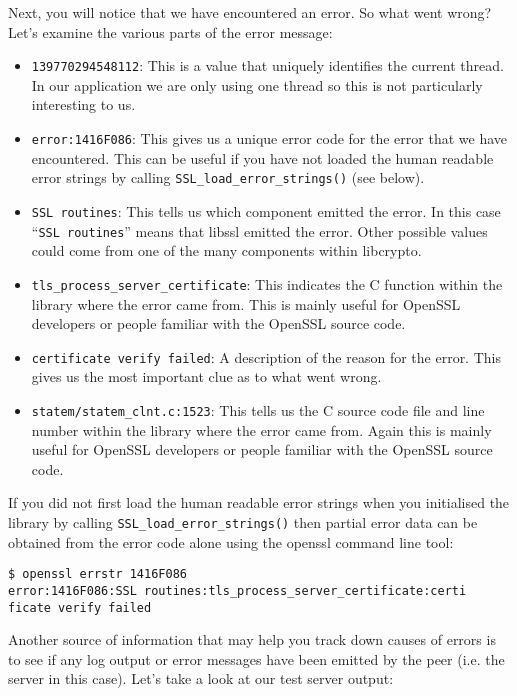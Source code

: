Next, you will notice that we have encountered an error. So what went wrong? 
Let's examine the various parts of the error message:
\begin{itemize}
\item \texttt{139770294548112}: This is a value that uniquely identifies the
current thread. In our application we are only using one thread so this is not 
particularly interesting to us.
\item \texttt{error:1416F086}: This gives us a unique error code for the error
that we have encountered. This can be useful if you have not loaded the human
readable error strings by calling \texttt{SSL\_load\_error\_strings()} (see
below).
\item \texttt{SSL routines}: This tells us which component emitted the error. In
this case ``\texttt{SSL routines}'' means that libssl emitted the error. Other
possible values could come from one of the many components within libcrypto.
\item \texttt{tls\_process\_server\_certificate}: This indicates the C function
within the library where the error came from. This is mainly useful for OpenSSL
developers or people familiar with the OpenSSL source code.
\item \texttt{certificate verify failed}: A description of the reason for the
error. This gives us the most important clue as to what went wrong.
\item \texttt{statem/statem\_clnt.c:1523}: This tells us the C source code file 
and line number within the library where the error came from. Again this is
mainly  useful for OpenSSL developers or people familiar with the OpenSSL
source code.
\end{itemize}

If you did not first load the human readable error strings when you initialised 
the library by calling \verb!SSL_load_error_strings()! then partial error data
can be obtained from the error code alone using the openssl command line tool:

\begin{verbatim}
$ openssl errstr 1416F086
error:1416F086:SSL routines:tls_process_server_certificate:certi
ficate verify failed
\end{verbatim}

Another source of information that may help you track down causes of errors is 
to see if any log output or error messages have been emitted by the peer (i.e. 
the server in this case). Let's take a look at our test server output:

